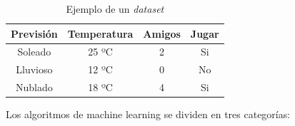 \documentclass[a4paper, 12pt]{book}
\begin{document}
 \begin{table}[]
     \centering
     \begin{tabular}{| c | c | c | c |}
            \hline
          Previsión & Temperatura & Amigos & Jugar\\
          \hline
           Soleado &  25 ºC & 2 & Si \\
           \hline
           Lluvioso &  12 ºC & 0 & No\\
           \hline
           Nublado &  18 ºC & 4 & Si\\
           \hline
     \end{tabular}
     \caption{Ejemplo de un \textit{dataset}}
     \label{tab:my_dataSet}
 \end{table}
 
 Los algoritmos de machine learning se dividen en tres categorías: 
\end{document}
